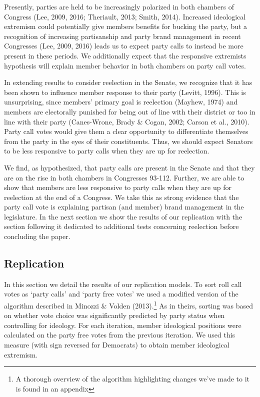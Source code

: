 \documentclass[12pt]{article}
\begin{document}
Presently, parties are held to be increasingly polarized in both chambers of Congress (Lee, 2009, 2016; Theriault, 2013; Smith, 2014). Increased ideological extremism could potentially give members benefits for bucking the party, but a recognition of increasing partisanship and party brand management in recent Congresses (Lee, 2009, 2016) leads us to expect party calls to instead  be more present in these periods. We additionally expect that the responsive extremists hypothesis will explain member behavior in both chambers on party call votes.

In extending results to consider reelection in the Senate, we recognize that it has been shown to influence member response to their party (Levitt, 1996). This is unsurprising, since members' primary goal is reelection (Mayhew, 1974) and members are electorally punished for being out of line with their district or too in line with their party (Canes-Wrone, Brady \& Cogan, 2002; Carson et al., 2010). Party call votes would give them a clear opportunity to differentiate themselves from the party in the eyes of their constituents. Thus, we should expect Senators to be less responsive to party calls when they are up for reelection.

We find, as hypothesized, that party calls are present in the Senate and that they are on the rise in both chambers in Congresses 93-112. Further, we are able to show that members are less responsive to party calls when they are up for reelection at the end of a Congress. We take this as strong evidence that the party call vote is explaining partisan (and member) brand management in the legislature. In the next section we show the results of our replication with the section following it dedicated to additional tests concerning reelection before concluding the paper.

\subsection{Replication}

In this section we detail the results of our replication models. To sort roll call votes as `party calls' and `party free votes' we used a modified version of the algorithm described in Minozzi \& Volden (2013).\footnote{A thorough overview of the algorithm highlighting changes we've made to it is found in an appendix} As in theirs, sorting was based on whether vote choice was significantly predicted by party status when controlling for ideology. For each iteration, member ideological positions were calculated on the party free votes from the previous iteration. We used this measure (with sign reversed for Democrats) to obtain member ideological extremism. 
\end{document}
